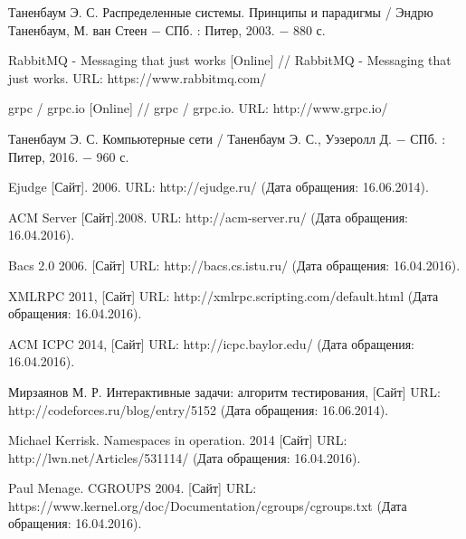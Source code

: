 \begin{thebibliography}{9}

Таненбаум Э. С. Распределенные системы. Принципы и парадигмы / Эндрю Таненбаум, М. ван Стеен − СПб. : Питер, 2003. − 880 с.

RabbitMQ - Messaging that just works [Online] // RabbitMQ - Messaging that just works. URL: https://www.rabbitmq.com/

grpc / grpc.io [Online] // grpc / grpc.io. URL: http://www.grpc.io/

Таненбаум Э. С. Компьютерные сети / Таненбаум Э. С., Уэзеролл Д. − СПб. : Питер, 2016. − 960 с.

Ejudge [Сайт]. 2006. URL: http://ejudge.ru/ (Дата обращения: 16.06.2014).

ACM Server [Сайт].2008. URL: http://acm-server.ru/ (Дата обращения: 16.04.2016).

Bacs 2.0 2006. [Сайт] URL: http://bacs.cs.istu.ru/ (Дата обращения: 16.04.2016).

XMLRPC 2011, [Сайт] URL: http://xmlrpc.scripting.com/default.html (Дата обращения: 16.04.2016).

ACM ICPC 2014, [Сайт] URL: http://icpc.baylor.edu/ (Дата обращения: 16.04.2016).

Мирзаянов М. Р. Интерактивные задачи: алгоритм тестирования, [Сайт] URL: http://codeforces.ru/blog/entry/5152 (Дата обращения: 16.06.2014).

Michael Kerrisk. Namespaces in operation. 2014 [Сайт] URL: http://lwn.net/Articles/531114/ (Дата обращения: 16.04.2016).

Paul Menage. CGROUPS 2004. [Сайт] URL: https://www.kernel.org/doc/Documentation/cgroups/cgroups.txt (Дата обращения: 16.04.2016).

\end{thebibliography}
